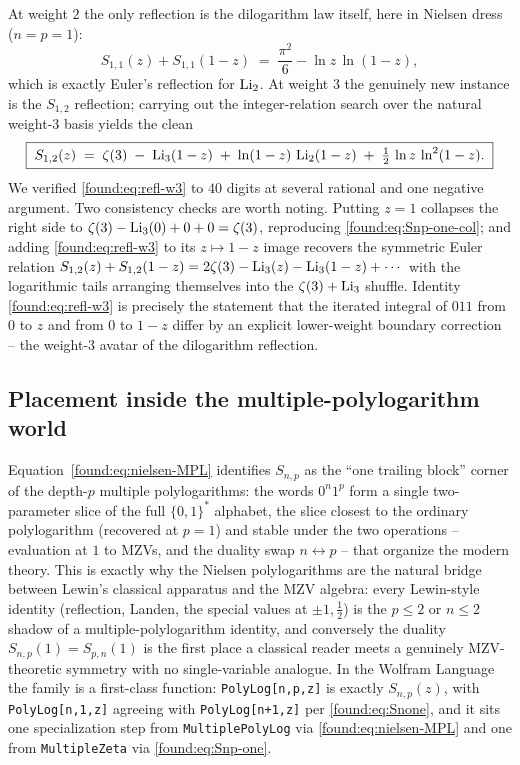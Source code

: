 At weight $2$ the only reflection is the dilogarithm law itself, here in Nielsen dress ($n=p=1$):
\begin{equation}\label{found:eq:refl-w2}
  S_{1,1}(z)+S_{1,1}(1-z)\;=\;\frac{\pi^2}{6}-\ln z\,\ln(1-z),
\end{equation}
which is exactly Euler's reflection for $\operatorname{Li}_2$. At weight $3$ the genuinely new instance is the $S_{1,2}$ reflection; carrying out the integer-relation search over the natural weight-$3$ basis yields the clean
\begin{equation}\label{found:eq:refl-w3}
  \boxed{\;S_{1,2}(z)\;=\;\zeta(3)\;-\;\operatorname{Li}_3(1-z)\;+\;\ln(1-z)\,\operatorname{Li}_2(1-z)\;+\;\tfrac12\,\ln z\,\ln^{2}(1-z).\;}
\end{equation}
We verified \eqref{found:eq:refl-w3} to $40$ digits at several rational and one negative argument. Two consistency checks are worth noting. Putting $z=1$ collapses the right side to $\zeta(3)-\operatorname{Li}_3(0)+0+0=\zeta(3)$, reproducing \eqref{found:eq:Snp-one-col}; and adding \eqref{found:eq:refl-w3} to its $z\mapsto1-z$ image recovers the symmetric Euler relation $S_{1,2}(z)+S_{1,2}(1-z)=2\zeta(3)-\operatorname{Li}_3(z)-\operatorname{Li}_3(1-z)+\cdots$ with the logarithmic tails arranging themselves into the $\zeta(3)+\operatorname{Li}_3$ shuffle. Identity \eqref{found:eq:refl-w3} is precisely the statement that the iterated integral of $011$ from $0$ to $z$ and from $0$ to $1-z$ differ by an explicit lower-weight boundary correction -- the weight-$3$ avatar of the dilogarithm reflection.



\subsection{Placement inside the multiple-polylogarithm world}

Equation~\eqref{found:eq:nielsen-MPL} identifies $S_{n,p}$ as the ``one trailing block'' corner of the depth-$p$ multiple polylogarithms: the words $0^{n}1^{p}$ form a single two-parameter slice of the full $\{0,1\}^{*}$ alphabet, the slice closest to the ordinary polylogarithm (recovered at $p=1$) and stable under the two operations -- evaluation at $1$ to MZVs, and the duality swap $n\leftrightarrow p$ -- that organize the modern theory. This is exactly why the Nielsen polylogarithms are the natural bridge between Lewin's classical apparatus and the MZV algebra: every Lewin-style identity (reflection, Landen, the special values at $\pm1,\tfrac12$) is the $p\le2$ or $n\le2$ shadow of a multiple-polylogarithm identity, and conversely the duality $S_{n,p}(1)=S_{p,n}(1)$ is the first place a classical reader meets a genuinely MZV-theoretic symmetry with no single-variable analogue. In the Wolfram Language the family is a first-class function: \texttt{PolyLog[n,p,z]} is exactly $S_{n,p}(z)$, with \texttt{PolyLog[n,1,z]} agreeing with \texttt{PolyLog[n+1,z]} per \eqref{found:eq:Snone}, and it sits one specialization step from \texttt{MultiplePolyLog} via \eqref{found:eq:nielsen-MPL} and one from \texttt{MultipleZeta} via \eqref{found:eq:Snp-one}.


